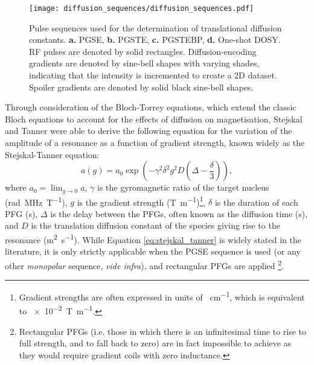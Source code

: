 \begin{figure}
   \texttt{[image: diffusion\_sequences/diffusion\_sequences.pdf]}
   \caption[
       Pulse sequences used for the determination of translational diffusion constants.
   ]{
       Pulse sequences used for the determination of translational diffusion constants.
       \textbf{a.} \acs{PGSE},
       \textbf{b.} \acs{PGSTE},
       \textbf{c.} \acs{PGSTEBP},
       \textbf{d.} One-shot DOSY.
       \ac{RF} pulses are denoted by solid rectangles. Diffusion-encoding
       gradients are denoted by sine-bell shapes with varying shades,
       indicating that the intensity is incremented to create a \ac{2D}
       dataset. Spoiler gradients are denoted by solid black sine-bell shapes.
   }
   \label{fig:diffusion_sequences}
\end{figure}

Through consideration of the Bloch-Torrey equations\cite{Torrey1956}, which
extend the classic Bloch equations to account for the effects of diffusion on
magnetisation, Stejskal and Tanner were able to derive the following equation
for the variation of the amplitude of a resonance as a function of gradient
strength, known widely as the Stejskal-Tanner equation:
\begin{equation}
    a(g) = a_0 \exp \left(- \gamma^2 \delta^2 g^2 D \left(\Delta -
    \frac{\delta}{3}\right)\right),
    \label{eq:stejskal_tanner}
\end{equation}
where
$a_0 = \lim_{g \rightarrow 0} a$,
$\gamma$ is the gyromagnetic ratio of the target nucleus
(\unit{\radian \mega\hertz\per\tesla}), 
$g$ is the gradient strength (\unit{\tesla\per\meter})\footnote{
    Gradient strengths are often expressed in units of
    \unit{\gauss\per\centi\meter}, which is equivalent to
    \qty[print-unity-mantissa = false]{e-2}{\tesla\per\meter}.
},
$\delta$ is the duration of each \ac{PFG} (\unit{\second}),
$\Delta$ is the delay between the \acp{PFG}, often known as the diffusion time
(\unit{\second}),
and $D$ is the translation diffusion constant of the species giving rise to the
resonance (\unit{\meter\squared\per\second}).
While Equation \ref{eq:stejskal_tanner} is widely stated in the literature, it is only strictly applicable when the \ac{PGSE} sequence
is used (or any other \emph{monopolar} sequence, \emph{vide infra}), and
rectangular \acp{PFG} are applied
\footnote{
    Rectangular \acp{PFG} (i.e. those in which there is an infinitesimal time
    to rise to full strength, and to fall back to zero) are in fact
    impossible to achieve as they would require gradient coils with zero
    inductance.
}.

